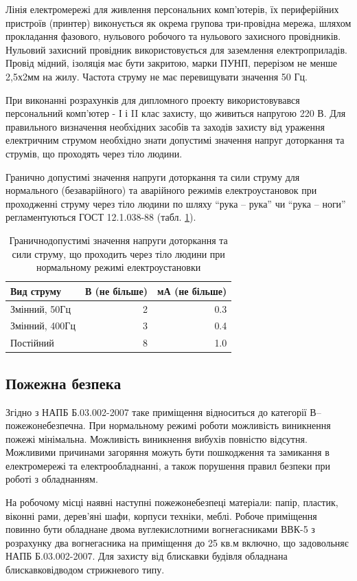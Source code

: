 Лінія електромережі для живлення персональних комп'ютерів, їх периферійних пристроїв (принтер) виконується як окрема групова три-провідна мережа, шляхом прокладання фазового, нульового робочого та нульового захисного провідників. Нульовий захисний провідник використовується для заземлення електроприладів. Провід мідний, ізоляція має бути закритою, марки ПУНП, перерізом не менше 2,5х2мм на жилу. Частота струму не має перевищувати значення 50 Гц.

При виконанні розрахунків для дипломного проекту використовувався персональний комп'ютер - І і II клас захисту, що живиться напругою 220 В. Для правильного визначення необхідних засобів та заходів захисту від ураження електричним струмом необхідно знати допустимі значення напруг доторкання та струмів, що проходять через тіло людини.

Гранично допустимі значення напруги доторкання та сили струму для нормального (безаварійного) та аварійного режимів електроустановок при проходженні струму через тіло людини по шляху ``рука – рука'' чи ``рука – ноги'' регламентуються ГОСТ 12.1.038-88 (табл. \ref{tab:current}).

\begin{table}[H]
	\centering
	\caption{Граничнодопустимі значення напруги доторкання та сили струму, що проходить через тіло людини при нормальному режимі електроустановки}
	\begin{tabular}{| l | r | r |}
		\hline
		Вид струму & В (не більше) & мА (не більше) \\\hline
		Змінний, 50Гц & 2 & 0.3 \\\hline
		Змінний, 400Гц & 3 & 0.4 \\\hline
		Постійний & 8 & 1.0 \\\hline
	\end{tabular}
	\label{tab:current}
\end{table}
\subsection{Пожежна безпека}
Згідно з НАПБ Б.03.002-2007 таке приміщення відноситься до категорії    В–пожежонебезпечна. При нормальному режимі роботи можливість виникнення пожежі мінімальна. Можливість виникнення вибухів повністю відсутня. Можливими причинами загоряння можуть бути пошкодження та замикання в електромережі та електрообладнанні, а також порушення правил безпеки при роботі з обладнанням.

На робочому місці наявні наступні пожежонебезпеці матеріали: папір, пластик, віконні рами, дерев’яні шафи, корпуси техніки, меблі. Робоче приміщення повинно бути обладнане двома вуглекислотними вогнегасниками ВВК-5 з розрахунку два вогнегасника на приміщення  до   25 кв.м  включно, що задовольняє НАПБ Б.03.002-2007. Для захисту від блискавки будівля обладнана блискавковідводом стрижневого типу.

